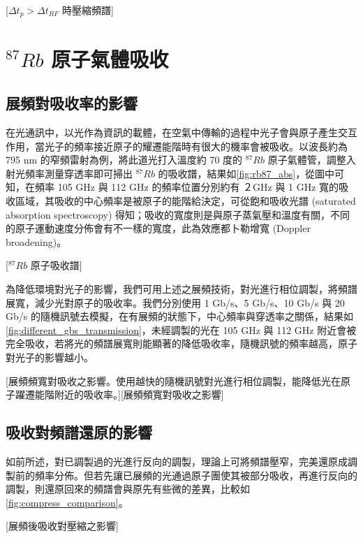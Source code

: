 \documentclass[class=NCU_thesis, crop=false]{standalone}
\begin{document}
[$\Delta t_{p}>\Delta t_{RF}$ 時壓縮頻譜]


\section{$^{87}Rb$ 原子氣體吸收}

\subsection{展頻對吸收率的影響}
\label{section:simulation_absorption}
在光通訊中，以光作為資訊的載體，在空氣中傳輸的過程中光子會與原子產生交互作用，當光子的頻率接近原子的耀遷能階時有很大的機率會被吸收。以波長約為 795  nm 的窄頻雷射為例，將此道光打入溫度約 70 度的 $^{87}Rb$ 原子氣體管，調整入射光頻率測量穿透率即可掃出 $^{87}Rb$ 的吸收譜，結果如\cref{fig:rb87_abs}，從圖中可知，在頻率 105 GHz 與 112 GHz 的頻率位置分別約有 ２GHz 與 1 GHz 寬的吸收區域，其吸收的中心頻率是被原子的能階給決定，可從飽和吸收光譜 (saturated absorption spectroscopy) 得知；吸收的寬度則是與原子蒸氣壓和溫度有關，不同的原子運動速度分佈會有不一樣的寬度，此為效應都卜勒增寬 (Doppler broadening)。

[$^{87}Rb$ 原子吸收譜]

為降低環境對光子的影響，我們可用上述之展頻技術，對光進行相位調製，將頻譜展寬，減少光對原子的吸收率。我們分別使用 1 Gb/s、5 Gb/s、10 Gb/s 與 20 Gb/s 的隨機訊號去模擬，在有展頻的狀態下，中心頻率與穿透率之關係，結果如\cref{fig:different_gbs_transmission}，未經調製的光在 105 GHz 與 112 GHz 附近會被完全吸收，若將光的頻譜展寬則能顯著的降低吸收率，隨機訊號的頻率越高，原子對光子的影響越小。

[展頻頻寬對吸收之影響。使用越快的隨機訊號對光進行相位調製，能降低光在原子躍遷能階附近的吸收率。][展頻頻寬對吸收之影響]

\subsection{吸收對頻譜還原的影響}
如前所述，對已調製過的光進行反向的調製，理論上可將頻譜壓窄，完美還原成調製前的頻率分佈。但若先讓已展頻的光通過原子團使其被部分吸收，再進行反向的調製，則還原回來的頻譜會與原先有些微的差異，比較如\cref{fig:compress_comparison}。

[展頻後吸收對壓縮之影響]

\end{document}
